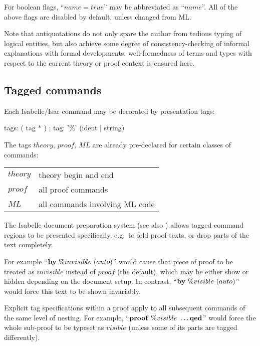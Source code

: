 For boolean flags, ``$name = true$'' may be abbreviated as ``$name$''.  All of
the above flags are disabled by default, unless changed from ML.

\medskip Note that antiquotations do not only spare the author from tedious
typing of logical entities, but also achieve some degree of
consistency-checking of informal explanations with formal developments:
well-formedness of terms and types with respect to the current theory or proof
context is ensured here.


\subsection{Tagged commands}\label{sec:tags}

Each Isabelle/Isar command may be decorated by presentation tags:

\begin{rail}
  tags: ( tag * )
  ;
  tag: '\%' (ident | string)
\end{rail}

The tags $theory$, $proof$, $ML$ are already pre-declared for certain classes
of commands:

\medskip

\begin{tabular}{ll}
  $theory$ & theory begin and end \\
  $proof$ & all proof commands \\
  $ML$ & all commands involving ML code \\
\end{tabular}

\medskip The Isabelle document preparation system (see also
\cite{isabelle-sys}) allows tagged command regions to be presented
specifically, e.g.\ to fold proof texts, or drop parts of the text completely.

For example ``${\mathord{\mathbf{by}}}~\%invisible~(auto)$'' would cause that piece of proof
to be treated as $invisible$ instead of $proof$ (the default), which may be
either show or hidden depending on the document setup.  In contrast,
``${\mathord{\mathbf{by}}}~\%visible~(auto)$'' would force this text to be shown invariably.

Explicit tag specifications within a proof apply to all subsequent commands of
the same level of nesting.  For example,
``${\mathord{\mathbf{proof}}}~\%visible~\dots{\mathord{\mathbf{qed}}}$'' would force the whole sub-proof to be
typeset as $visible$ (unless some of its parts are tagged differently).

